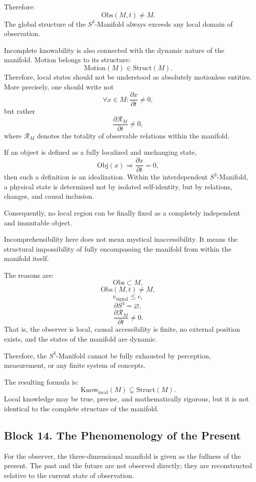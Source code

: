 \documentclass[12pt,a4paper]{article}
\theoremstyle{definition}
\begin{document}
Therefore:
\[
\mathrm{Obs}(M,t)\neq M.
\]
The global structure of the \(S^3\)-Manifold always exceeds any local domain of observation.

Incomplete knowability is also connected with the dynamic nature of the manifold. Motion belongs to its structure:
\[
\mathrm{Motion}(M)\in \mathrm{Struct}(M).
\]
Therefore, local states should not be understood as absolutely motionless entities. More precisely, one should write not
\[
\forall x\in M:\frac{\partial x}{\partial t}\neq 0,
\]
but rather
\[
\frac{\partial \mathcal R_M}{\partial t}\neq 0,
\]
where \(\mathcal R_M\) denotes the totality of observable relations within the manifold.

If an object is defined as a fully localized and unchanging state,
\[
\mathrm{Obj}(x)\Rightarrow \frac{\partial x}{\partial t}=0,
\]
then such a definition is an idealization. Within the interdependent \(S^3\)-Manifold, a physical state is determined not by isolated self-identity, but by relations, changes, and causal inclusion.

Consequently, no local region can be finally fixed as a completely independent and immutable object.

Incomprehensibility here does not mean mystical inaccessibility. It means the structural impossibility of fully encompassing the manifold from within the manifold itself.

The reasons are:
\[
\mathrm{Obs}\subset M,
\]
\[
\mathrm{Obs}(M,t)\neq M,
\]
\[
v_{\mathrm{signal}}\leq c,
\]
\[
\partial S^3=\varnothing,
\]
\[
\frac{\partial \mathcal R_M}{\partial t}\neq 0.
\]
That is, the observer is local, causal accessibility is finite, no external position exists, and the states of the manifold are dynamic.

Therefore, the \(S^3\)-Manifold cannot be fully exhausted by perception, measurement, or any finite system of concepts.

The resulting formula is:
\[
\mathrm{Know}_{\mathrm{local}}(M)
\subsetneq
\mathrm{Struct}(M).
\]
Local knowledge may be true, precise, and mathematically rigorous, but it is not identical to the complete structure of the manifold.



\subsection{Block 14. The Phenomenology of the Present}
For the observer, the three-dimensional manifold is given as the fullness of the present. The past and the future are not observed directly; they are reconstructed relative to the current state of observation.
\end{document}
